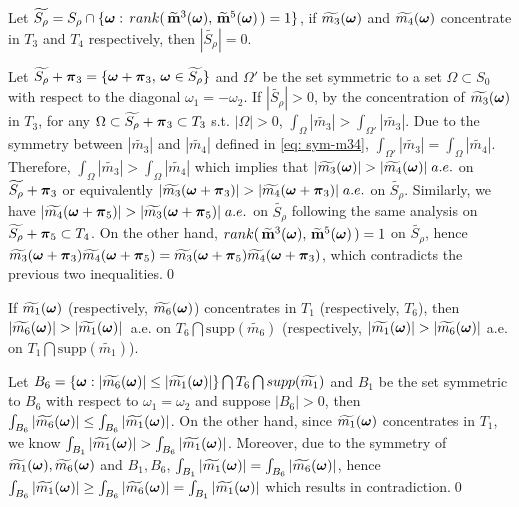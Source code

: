 \begin{lemma}\label{lem: full-rank-m35}
Let $\widetilde{S_\rho} = S_\rho\cap\{\boldsymbol{\omega}:\, rank(\,\widetilde{\mathbf{m}}^{3}(\boldsymbol{\omega}),\,\widetilde{\mathbf{m}}^{5}(\boldsymbol{\omega})\,)= 1\}$, if $\widetilde{m_{3}}(\boldsymbol{\omega})$ and $\widetilde{m_{4}}(\boldsymbol{\omega})$ concentrate in $T_3$ and $T_4$ respectively, then $|\widetilde{S_\rho}|=0$.
\end{lemma}
Let $\widetilde{S_\rho} + \boldsymbol{\pi}_3 = \{\boldsymbol{\omega} + \boldsymbol{\pi}_3,\, \boldsymbol{\omega}\in \widetilde{S_\rho}\}$ and $\Omega'$ be the set symmetric to a set $\Omega\subset S_0$ with respect to the diagonal $\omega_1 = -\omega_2$. If $|\widetilde{S_\rho}|>0$, by the concentration of $\widetilde{m_{3}}(\boldsymbol{\omega})$ in $T_3$, for any $\Omega\subset \widetilde{S_\rho} + \boldsymbol{\pi}_3\subset T_3$ s.t. $|\Omega|> 0$, $\int_{\Omega}|\widetilde{m_3}| > \int_{\Omega'}|\widetilde{m_3}|$. Due to the symmetry between $|\widetilde{m_3}|$ and $|\widetilde{m_4}|$ defined in \eqref{eq: sym-m34}, $\int_{\Omega'}|\widetilde{m_3}| = \int_{\Omega}|\widetilde{m_4}|$. Therefore, $\int_{\Omega}|\widetilde{m_3}| >  \int_\Omega|\widetilde{m_4}|$ which implies that $|\widetilde{m_{3}}(\boldsymbol{\omega})| > |\widetilde{m_{4}}(\boldsymbol{\omega})|\; a.e.$ on $\widetilde{S_\rho}+\boldsymbol{\pi}_3$ or equivalently $|\widetilde{m_3}(\boldsymbol{\omega}+\boldsymbol{\pi}_3)| > |\widetilde{m_4}(\boldsymbol{\omega}+\boldsymbol{\pi}_3)|\; a.e.$ on $\widetilde{S_\rho}$. Similarly, we have $|\widetilde{m_4}(\boldsymbol{\omega}+\boldsymbol{\pi}_5)| > |\widetilde{m_3}(\boldsymbol{\omega}+\boldsymbol{\pi}_5)|\; a.e.$ on $\widetilde{S_\rho}$ following the same analysis on $\widetilde{S_\rho}+\boldsymbol{\pi}_5\subset T_4$.
On the other hand, $rank(\,\widetilde{\mathbf{m}}^{3}(\boldsymbol{\omega}),\,\widetilde{\mathbf{m}}^{5}(\boldsymbol{\omega})\,)= 1$ on $\widetilde{S_\rho}$, hence $\widetilde{m_3}(\boldsymbol{\omega}+\boldsymbol{\pi}_3)\widetilde{m_4}(\boldsymbol{\omega}+\boldsymbol{\pi}_5) = \widetilde{m_3}(\boldsymbol{\omega}+\boldsymbol{\pi}_5)\widetilde{m_4}(\boldsymbol{\omega}+\boldsymbol{\pi}_3)$, which contradicts the previous two inequalities.\qed

\begin{lemma}\label{lem: concentrate}
If $\widetilde{m_{1}}(\boldsymbol{\omega}) $ {\rm (}respectively, $\widetilde{m_{6}}(\boldsymbol{\omega})${\rm)} concentrates in $T_1$ {\rm(}respectively, $T_6${\rm)}, then $|\widetilde{m_{6}}(\boldsymbol{\omega})| > |\widetilde{m_{1}}(\boldsymbol{\omega})|\,$ a.e. on $T_6\bigcap \text{supp}(\widetilde{m_6})$ {\rm (}respectively, $|\widetilde{m_{1}}(\boldsymbol{\omega})| > |\widetilde{m_{6}}(\boldsymbol{\omega})|$ 
a.e. on $T_1\bigcap\text{supp}(\widetilde{m_1})${\rm )}.
\end{lemma}
Let $B_6=\{\boldsymbol{\omega}: |\widetilde{m_{6}}(\boldsymbol{\omega})| \leq |\widetilde{m_{1}}(\boldsymbol{\omega})|\}\bigcap T_6\bigcap supp(\widetilde{m_1})$ and $B_1$ be the set symmetric to $B_6$ with respect to $\omega_1 = \omega_2$ and suppose $|B_6|>0$, then $\int_{B_6}|\widetilde{m_{6}}(\boldsymbol{\omega})|\leq \int_{B_6}|\widetilde{m_{1}}(\boldsymbol{\omega})|$. On the other hand, since $\widetilde{m_{1}}(\boldsymbol{\omega})$ concentrates in $T_1$, we know $\int_{B_1}|\widetilde{m_{1}}(\boldsymbol{\omega})| > \int_{B_6}|\widetilde{m_{1}}(\boldsymbol{\omega})|$. Moreover, due to the symmetry of $\widetilde{m_{1}}(\boldsymbol{\omega}),\widetilde{m_{6}}(\boldsymbol{\omega})$ and $B_1,B_6$, $\int_{B_1}|\widetilde{m_{1}}(\boldsymbol{\omega})| = \int_{B_6}|\widetilde{m_{6}}(\boldsymbol{\omega})|$, hence $\int_{B_6}|\widetilde{m_{1}}(\boldsymbol{\omega})| \geq\int_{B_6}|\widetilde{m_{6}}(\boldsymbol{\omega})| = \int_{B_1}|\widetilde{m_{1}}(\boldsymbol{\omega})| $ which results in contradiction.\qed

